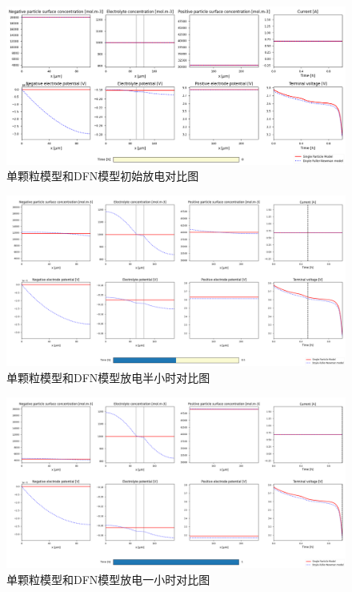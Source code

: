 \documentclass[12pt]{ctexart}%
\begin{document}
\begin{figure}[h]
	\centering
	\includegraphics[scale = 0.4]{SPM-DFN1}
	\caption{单颗粒模型和DFN模型初始放电对比图}
	\label{o}
\end{figure}

\begin{figure}[H]
	\centering
	\includegraphics[scale = 0.32]{SPM-DFN2}
	\caption{单颗粒模型和DFN模型放电半小时对比图}
	\label{p}
\end{figure}

\begin{figure}[H]
	\centering
	\includegraphics[scale = 0.32]{SPM-DFN3}
	\caption{单颗粒模型和DFN模型放电一小时对比图}
	\label{q}
\end{figure}
\end{document}
